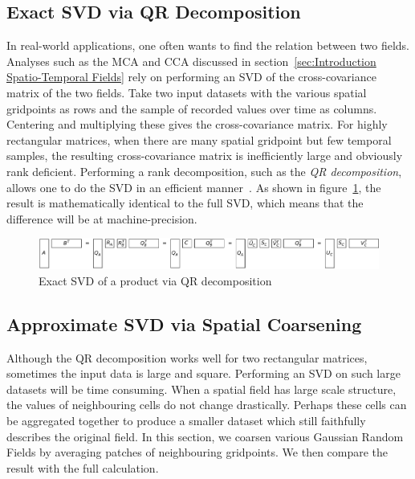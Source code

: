 \documentclass[sigconf]{acmart}
\begin{document}
\subsection{Exact SVD via QR Decomposition}
\label{sec:Techniques Exact SVD via QR Decomposition}

In real-world applications, one often wants to find the relation between two fields. Analyses such as the MCA and CCA discussed in section~\ref{sec:Introduction Spatio-Temporal Fields} rely on performing an SVD of the cross-covariance matrix of the two fields. Take two input datasets with the various spatial gridpoints as rows and the sample of recorded values over time as columns. Centering and multiplying these gives the cross-covariance matrix. For highly rectangular matrices, when there are many spatial gridpoint but few temporal samples, the resulting cross-covariance matrix is inefficiently large and obviously rank deficient. Performing a rank decomposition, such as the \textit{QR decomposition}, allows one to do the SVD in an efficient manner~\cite{Chan1982, Tygert2017}. As shown in figure~\ref{fig:qrProductSVD}, the result is mathematically identical to the full SVD, which means that the difference will be at machine-precision.

\begin{figure}[h]
\begin{center}
\includegraphics[width=\columnwidth]{Results/qrProductSVD.pdf}
\caption[Exact SVD via QR decomposition]{Exact SVD of a product via QR decomposition}
\label{fig:qrProductSVD}
\end{center}
\end{figure}

\subsection{Approximate SVD via Spatial Coarsening}
\label{sec:Techniques Approximate SVD via Spatial Coarsening}

Although the QR decomposition works well for two rectangular matrices, sometimes the input data is large and square. Performing an SVD on such large datasets will be time consuming. When a spatial field has large scale structure, the values of neighbouring cells do not change drastically. Perhaps these cells can be aggregated together to produce a smaller dataset which still faithfully describes the original field. In this section, we coarsen various Gaussian Random Fields by averaging patches of neighbouring gridpoints. We then compare the result with the full calculation.
\end{document}
